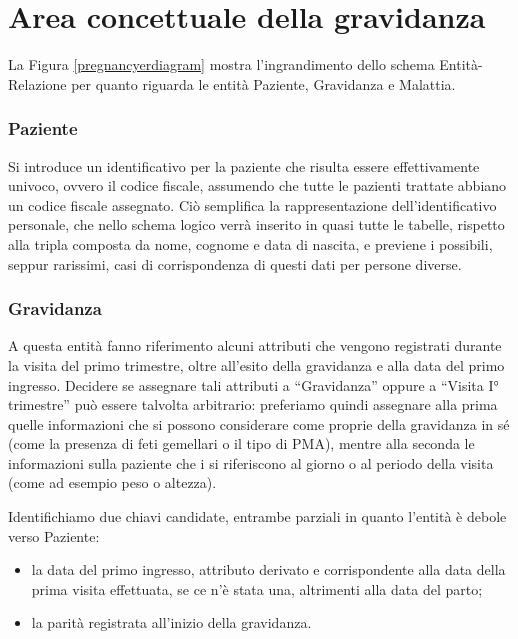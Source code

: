 \section{Area concettuale della gravidanza}
\label{pregnancyconceptual}

La Figura \ref{pregnancyerdiagram} mostra l'ingrandimento dello schema Entità-Relazione per quanto riguarda le entità Paziente, Gravidanza e Malattia.

\subsubsection{Paziente}

Si introduce un identificativo per la paziente che risulta essere effettivamente univoco, ovvero il codice fiscale, assumendo che tutte le pazienti trattate abbiano un codice fiscale assegnato.
Ciò semplifica la rappresentazione dell'identificativo personale, che nello schema logico verrà inserito in quasi tutte le tabelle, rispetto alla tripla composta da nome, cognome e data di nascita, e previene i possibili, seppur rarissimi, casi di corrispondenza di questi dati per persone diverse.

\subsubsection{Gravidanza}

A questa entità fanno riferimento alcuni attributi che vengono registrati durante la visita del primo trimestre, oltre all'esito della gravidanza e alla data del primo ingresso.
Decidere se assegnare tali attributi a \enquote{Gravidanza} oppure a \enquote{Visita I° trimestre} può essere talvolta arbitrario: preferiamo quindi assegnare alla prima quelle informazioni che si possono considerare come proprie della gravidanza in sé (come la presenza di feti gemellari o il tipo di PMA), mentre alla seconda le informazioni sulla paziente che i si riferiscono al giorno o al periodo della visita (come ad esempio peso o altezza).

Identifichiamo due chiavi candidate, entrambe parziali in quanto l'entità è debole verso Paziente:
\begin{itemize}
\item la data del primo ingresso, attributo derivato e corrispondente alla data della prima visita effettuata, se ce n'è stata una, altrimenti alla data del parto;
\item la parità registrata all'inizio della gravidanza.
\end{itemize}

